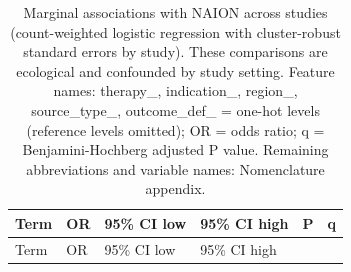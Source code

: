 \documentclass[
  11pt,
]{article}
\begin{document}
\begin{longtable}[]{@{}
  >{\raggedright\arraybackslash}p{}
  >{\raggedright\arraybackslash}p{}
  >{\raggedright\arraybackslash}p{}
  >{\raggedright\arraybackslash}p{}
  >{\raggedright\arraybackslash}p{}
  >{\raggedright\arraybackslash}p{}@{}}
\caption{Marginal associations with NAION across studies (count-weighted
logistic regression with cluster-robust standard errors by study). These
comparisons are ecological and confounded by study setting. Feature
names: therapy\_, indication\_, region\_, source\_type\_, outcome\_def\_
= one-hot levels (reference levels omitted); OR = odds ratio; q =
Benjamini-Hochberg adjusted P value. Remaining abbreviations and
variable names: Nomenclature appendix.}\tabularnewline
\toprule\noalign{}
\begin{minipage}[b]{\linewidth}\raggedright
Term
\end{minipage} & \begin{minipage}[b]{\linewidth}\raggedright
OR
\end{minipage} & \begin{minipage}[b]{\linewidth}\raggedright
95\% CI low
\end{minipage} & \begin{minipage}[b]{\linewidth}\raggedright
95\% CI high
\end{minipage} & \begin{minipage}[b]{\linewidth}\raggedright
P
\end{minipage} & \begin{minipage}[b]{\linewidth}\raggedright
q
\end{minipage} \\
\midrule\noalign{}
\endfirsthead
\toprule\noalign{}
\begin{minipage}[b]{\linewidth}\raggedright
Term
\end{minipage} & \begin{minipage}[b]{\linewidth}\raggedright
OR
\end{minipage} & \begin{minipage}[b]{\linewidth}\raggedright
95\% CI low
\end{minipage} & \begin{minipage}[b]{\linewidth}\raggedright
95\% CI high
\end{minipage} & \begin{minipage}[b]{\linewidth}\raggedright

\end{minipage}
\end{longtable}
\end{document}
